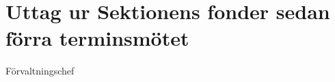 \documentclass[../_main/handlingar.tex]{subfiles}
\begin{document}
\section{Uttag ur Sektionens fonder sedan förra terminsmötet}

\begin{signatures}{1}
    \ist
    \signature{Sophia Grimmeiss Grahm}{Förvaltningschef}
\end{signatures}
\end{document}
